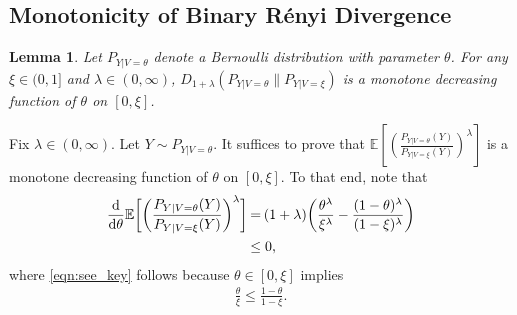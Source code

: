 \documentclass[journal, 10pt]{IEEEtran}
\newcommand{\bbE}{\mathbb{E}}
\newcommand{\rmd}{\mathrm{d}}
\theoremstyle{plain}
\theoremstyle{plain}
\newtheorem{lem}{Lemma}%
\theoremstyle{plain}
\theoremstyle{plain}
\begin{document}
\begin{appendices}
\section{Monotonicity of Binary R\'enyi Divergence} \label{appdx:monotonicity of binary renyi divergence}

\begin{lem} \label{lem:renyi divergence monotone decreasing}
Let $P_{Y|V=\theta}$ denote a Bernoulli distribution with parameter $\theta$. For any $\xi \in (0,1]$ and $\lambda \in (0,\infty) $, $D_{1+\lambda}(P_{Y|V=\theta}\|P_{Y|V=\xi})$ is a monotone decreasing function of $\theta$ on $[0,\xi]$. 
\end{lem}
\begin{IEEEproof} 
Fix $\lambda \in (0, \infty)$. Let $Y\sim P_{Y|V=\theta}$. It suffices to prove that $\bbE\left[ \left( \frac{P_{Y|V=\theta}(Y)}{P_{Y|V=\xi}(Y)} \right)^\lambda \right]  $
is a monotone decreasing function of $\theta$ on $[0,\xi]$. To that end, note that
\begin{align}
\frac{\rmd}{\rmd\theta}\bbE\bigg[ \bigg( \frac{P_{Y|V=\theta}(Y)}{P_{Y|V=\xi}(Y)} \bigg)^\lambda \bigg] \hspace{-0.3mm}
&=\hspace{-0.3mm} (1+\lambda) \bigg( \frac{\theta^{\lambda}}{\xi^{\lambda}}-\frac{(1-\theta)^{\lambda}}{(1-\xi)^{\lambda}} \bigg) \\
&\le 0\text{,} \label{eqn:see_key}
\end{align}
where \eqref{eqn:see_key} follows because $\theta\in [0,\xi]$ implies
\begin{align}
\frac{\theta}{\xi} \le \frac{1-\theta}{1-\xi}\text{.}
\end{align} 
\end{IEEEproof}

\end{appendices}
\end{document}

